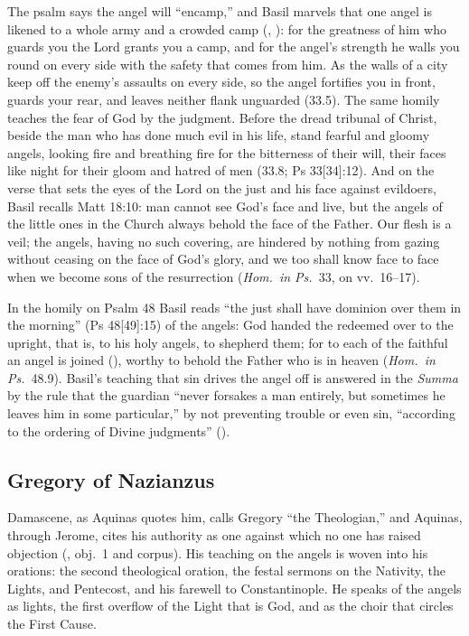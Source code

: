 The psalm says the angel will ``encamp,'' and Basil marvels that one
angel is likened to a whole army and a crowded camp
(, ): for the greatness of him who
guards you the Lord grants you a camp, and for the angel's strength he
walls you round on every side with the safety that comes from him. As the
walls of a city keep off the enemy's assaults on every side, so the angel
fortifies you in front, guards your rear, and leaves neither flank
unguarded (33.5). The same homily teaches the fear of God by the
judgment. Before the dread tribunal of Christ, beside the man who has done
much evil in his life, stand fearful and gloomy angels, looking fire and
breathing fire for the bitterness of their will, their faces like night
for their gloom and hatred of men (33.8; Ps 33[34]:12). And on the verse
that sets the eyes of the Lord on the just and his face against
evildoers, Basil recalls Matt 18:10: man cannot see God's face and live,
but the angels of the little ones in the Church always behold the face of
the Father. Our flesh is a veil; the angels, having no such covering, are
hindered by nothing from gazing without ceasing on the face of God's
glory, and we too shall know face to face when we become sons of the
resurrection (\emph{Hom.\ in Ps.}\ 33, on vv.~16--17).

In the homily on Psalm 48 Basil reads ``the just shall have dominion
over them in the morning'' (Ps 48[49]:15) of the angels: God handed the
redeemed over to the upright, that is, to his holy angels, to shepherd
them; for to each of the faithful an angel is joined
(), worthy to behold the Father who is in heaven
(\emph{Hom.\ in Ps.}\ 48.9). Basil's teaching
that sin drives the angel off is answered in the \emph{Summa} by the rule that
the guardian ``never forsakes a man entirely, but sometimes he leaves him
in some particular,'' by not preventing trouble or even sin, ``according
to the ordering of Divine judgments'' ().

\sectionguard
\subsection{Gregory of Nazianzus}\label{sec:fb-nazianzen}

Damascene, as Aquinas quotes him, calls Gregory ``the Theologian,'' and
Aquinas, through Jerome, cites his authority as one against which no one
has raised objection (, obj.~1 and corpus). His teaching on the angels is
woven into his orations: the second theological oration, the festal
sermons on the Nativity, the Lights, and Pentecost, and his farewell to
Constantinople. He speaks of the angels as lights, the first overflow of
the Light that is God, and as the choir that circles the First Cause.

